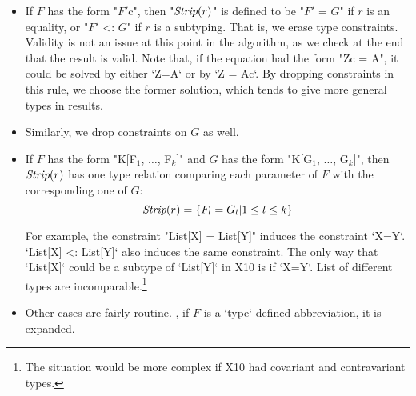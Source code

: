 \begin{itemize}
\item If $F$ has the form \xcdmath"$F'${c}", then  
\xcdmath"$\mbox{\it Strip}(r)$" is defined to be
 \xcdmath"$F'$ = $G$" if $r$ is an equality, or 
 \xcdmath"$F'$ <: $G$" if {$r$} is a subtyping.
That is, we erase type constraints.  
Validity is not an issue at this point in the algorithm, as 
we check at the end that the result is valid.
Note that, if the equation had the form \xcdmath"Z{c} = A", it could be
solved by either \xcd`Z=A` or by \xcd`Z = A{c}`.  By dropping constraints in this
rule, we choose the former solution, which tends to give more general types in
results. 

\item Similarly, we drop constraints on {$G$} as well.

\item If {$F$} has the form \xcdmath"K[F$_1$, $\ldots$, F$_k$]"
and 
{$G$}
has the form \xcdmath"K[G$_1$, $\ldots$, G$_k$]", 
then {$\mbox{\it Strip}(r)$} has one type relation comparing each parameter of 
{$F$} with the corresponding one of {$G$}: 
\[\mbox{\it Strip}(r) = \{ F_l = G_l | 1 \le l \le k \} \]

For example, the constraint \xcdmath"List[X] = List[Y]" induces the
constraint \xcd`X=Y`.  
\xcd`List[X] <: List[Y]` also induces the same constraint.  The only way that
\xcd`List[X]` could be a subtype of \xcd`List[Y]` in X10 is if \xcd`X=Y`.
List of different types are incomparable.\footnote{The situation would be more
complex if X10 had covariant and contravariant types.}

\item Other cases are fairly routine.  \Eg, if {$F$} is a \xcd`type`-defined
      abbreviation, it is expanded.

\end{itemize}

